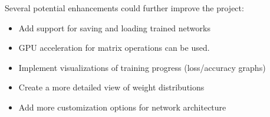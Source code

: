 \documentclass[12pt]{article}
\begin{document}
Several potential enhancements could further improve the project:


\begin{itemize}
    \item Add support for saving and loading trained networks
    \item GPU acceleration for matrix operations can be used. 
    \item Implement visualizations of training progress (loss/accuracy graphs)
    \item Create a more detailed view of weight distributions
    \item Add more customization options for network architecture
\end{itemize}
\end{document}
